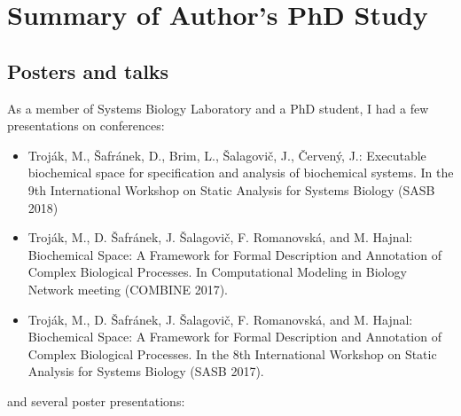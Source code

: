 \documentclass[11pt,a4paper]{report}
\begin{document}




\appendix

\chapter{Summary of Author’s PhD Study}

\section{Posters and talks}

As a member of Systems Biology Laboratory and a PhD student, I had a few presentations on conferences:

\begin{itemize}
 \item Troják, M., Šafránek, D., Brim, L., Šalagovič, J., Červený, J.: Executable biochemical space for specification and analysis of biochemical systems. In the 9th International Workshop on Static Analysis for Systems Biology (SASB 2018)
 \item Troják, M., D. Šafránek, J. Šalagovič, F. Romanovská, and M. Hajnal: Biochemical Space: A Framework for Formal Description and Annotation of Complex Biological Processes. In Computational Modeling in Biology Network meeting (COMBINE 2017).
 \item Troják, M., D. Šafránek, J. Šalagovič, F. Romanovská, and M. Hajnal: Biochemical Space: A Framework for Formal Description and Annotation of Complex Biological Processes. In the 8th International Workshop on Static Analysis for Systems Biology (SASB 2017).
\end{itemize}

\noindent and several poster presentations:
\end{document}
